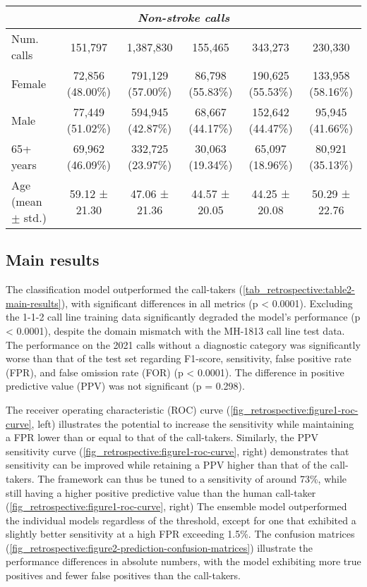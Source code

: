 {\begin{table}[t]
{\begin{tabular}{l|ccccc}
        \midrule
        \multicolumn{6}{c}{\emph{Non-stroke calls}} \\
        \midrule
        Num. calls            & 151,797 & 1,387,830 & 155,465 & 343,273 & 230,330 \\
        Female                & 72,856 (48.00\%) & 791,129 (57.00\%) & 86,798 (55.83\%) & 190,625 (55.53\%) & 133,958 (58.16\%) \\
        Male                  & 77,449 (51.02\%) & 594,945 (42.87\%) & 68,667 (44.17\%) & 152,642 (44.47\%) & 95,945 (41.66\%) \\
        65+ years             & 69,962 (46.09\%) & 332,725 (23.97\%) & 30,063 (19.34\%) & 65,097 (18.96\%) & 80,921 (35.13\%) \\
        Age (mean $\pm$ std.) & 59.12 ± 21.30 & 47.06 ± 21.36 & 44.57 ± 20.05 & 44.25 ± 20.08 & 50.29 ± 22.76 \\

        \bottomrule
    \end{tabular}%
    }
\end{table}

\subsection{Main results}

The classification model outperformed the call-takers (\cref{tab_retrospective:table2-main-results}), with significant differences in all metrics (p < 0.0001). Excluding the 1-1-2 call line training data significantly degraded the model's performance (p < 0.0001), despite the domain mismatch with the MH-1813 call line test data. The performance on the 2021 calls without a diagnostic category was significantly worse than that of the test set regarding F1-score, sensitivity, false positive rate (FPR), and false omission rate (FOR) (p < 0.0001). The difference in positive predictive value (PPV) was not significant (p = 0.298).

The receiver operating characteristic (ROC) curve (\cref{fig_retrospective:figure1-roc-curve}, left) illustrates the potential to increase the sensitivity while maintaining a FPR lower than or equal to that of the call-takers. Similarly, the PPV sensitivity curve (\cref{fig_retrospective:figure1-roc-curve}, right) demonstrates that sensitivity can be improved while retaining a PPV higher than that of the call-takers. The framework can thus be tuned to a sensitivity of around 73\%, while still having a higher positive predictive value than the human call-taker (\cref{fig_retrospective:figure1-roc-curve}, right) The ensemble model outperformed the individual models regardless of the threshold, except for one that exhibited a slightly better sensitivity at a high FPR exceeding 1.5\%. The confusion matrices (\cref{fig_retrospective:figure2-prediction-confusion-matrices}) illustrate the performance differences in absolute numbers, with the model exhibiting more true positives and fewer false positives than the call-takers.

}
